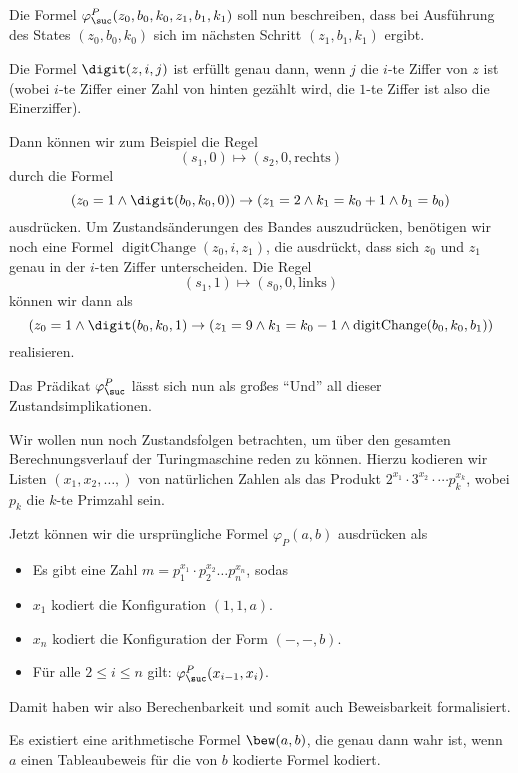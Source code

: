 \documentclass[ngerman]{scrartcl}
\begin{document}
Die Formel $\varphi^P _{\suc}(z_0, b_0, k_0, z_1, b_1, k_1)$ soll nun beschreiben,
dass bei Ausführung des States $(z_0, b_0, k_0)$ sich im nächsten Schritt
$(z_1, b_1, k_1)$ ergibt.

Die Formel $\digit(z, i, j)$ ist erfüllt genau dann,
wenn $j$ die $i$-te Ziffer von $z$ ist (wobei $i$-te Ziffer einer Zahl von hinten gezählt wird, die $1$-te Ziffer ist also die Einerziffer).

Dann können wir zum Beispiel die Regel
\[
  (s_1, 0) \mapsto (s_2, 0, \text{rechts})
\]
durch die Formel
\[
  (z_0 = 1 \land \digit(b_0, k_0, 0)) \to (z_1 = 2 \land k_1 = k_0 + 1 \land b_1 = b_0)
\]
ausdrücken.
Um Zustandsänderungen des Bandes auszudrücken, benötigen wir noch eine Formel
$\operatorname{digitChange}(z_0, i, z_1)$, die ausdrückt, dass sich $z_0$ und $z_1$ genau
in der $i$-ten Ziffer unterscheiden.
Die Regel
\[
  (s_1, 1) \mapsto (s_0, 0, \text{links})
\]
können wir dann als
\[
  (z_0 = 1 \land \digit(b_0, k_0, 1) \to (z_1 = 9 \land k_1 = k_0 - 1 \land \operatorname{digitChange}(b_0, k_0, b_1))
\]
realisieren.

Das Prädikat $\varphi ^P_{\suc}$ lässt sich nun als großes \enquote{Und} all dieser
Zustandsimplikationen.

Wir wollen nun noch Zustandsfolgen betrachten, um über den gesamten Berechnungsverlauf
der Turingmaschine reden zu können.
Hierzu kodieren wir Listen $(x_1, x_2, \dotsc, )$ von natürlichen Zahlen als das Produkt $2^{x_1} \cdot  3^{x_2} \cdot  \dotsb p_k^{x_k}$, wobei $p_k$ die $k$-te Primzahl sein.

Jetzt können wir die ursprüngliche Formel $\varphi _P(a,b)$ ausdrücken als
\begin{itemize}
  \item Es gibt eine Zahl $m = p_1^{x_1} \cdot p_2^{x_2} \dotsc p_n^{x_n}$, sodas
  \item $x_1$ kodiert die Konfiguration $(1,1,a)$.
  \item $x_n$ kodiert die Konfiguration der Form $(-, -, b)$.
  \item Für alle $2 \leq i \leq n$ gilt: $\varphi ^P_{\suc}(x_{i-1}, x_i)$.
\end{itemize}

Damit haben wir also Berechenbarkeit und somit auch Beweisbarkeit formalisiert.

\begin{corollary}
  Es existiert eine arithmetische Formel $\bew(a,b)$, die genau dann wahr ist,
  wenn $a$ einen Tableaubeweis für die von $b$ kodierte Formel kodiert.
\end{corollary}
\end{document}
